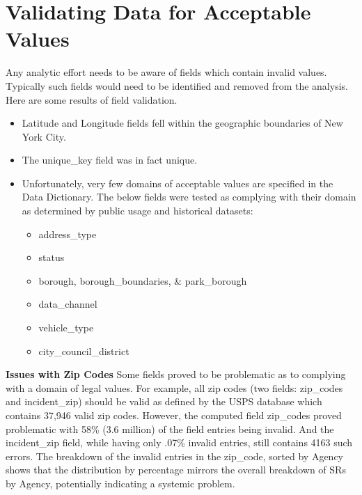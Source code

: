 \documentclass[12pt, titlepage]{article}
\begin{document}



 \section{Validating Data for Acceptable Values}
 \label{sec:domain}
Any analytic effort needs to be aware of fields which 
contain invalid values. Typically such fields would need to be
identified and removed from the analysis. Here are some results
of field validation.

\begin{itemize}
	\item Latitude and Longitude fields fell within the geographic 
	boundaries of New York City. 
	
	\item The unique\_key field was in fact unique.
	
	\item Unfortunately, very few domains of acceptable 
	values are specified in the Data Dictionary. The below 
	fields were tested as complying with their domain as 
	determined by public usage and historical datasets:
	\begin{itemize}
		\item address\_type
		\item status
		\item borough, borough\_boundaries, \& park\_borough 
		\item data\_channel
		\item vehicle\_type
		\item city\_council\_district
	\end{itemize}	
\end{itemize}

\label{sec:zipcodesissues}
 \textbf{Issues with Zip Codes} Some fields proved to be problematic 
 as to complying with a domain of legal values. For example, all zip codes 
 (two fields: zip\_codes and incident\_zip) should be valid as defined 
 by the USPS database which contains 37,946 valid zip codes. However,
 the computed field zip\_codes proved problematic with 
58\% (3.6 million) of the field entries being invalid. And the 
incident\_zip field, while having only .07\% invalid entries, still contains
4163 such errors. The breakdown of the invalid entries in the zip\_code, sorted by 
Agency shows that the distribution by percentage mirrors the overall 
breakdown of SRs by Agency, potentially indicating a systemic problem.
	
\end{document}
